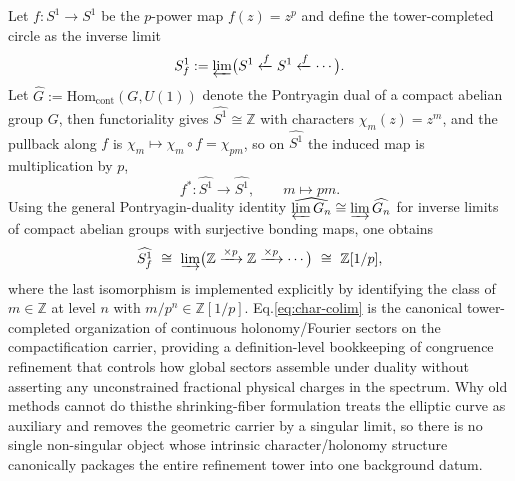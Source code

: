 \documentclass[11pt]{article}
\theoremstyle{remark}
\newcommand{\Z}{\mathbb{Z}}
\begin{document}
Let \(f:S^{1}\to S^{1}\) be the \(p\)-power map \(f(z)=z^{p}\) and define the tower-completed circle as the inverse limit
\begin{equation}\label{eq:Sf1-inv}
S_f^{1}:=\varprojlim\bigl(S^{1}\xleftarrow{f}S^{1}\xleftarrow{f}\cdots\bigr).
\end{equation}
Let \(\widehat{G}:=\mathrm{Hom}_{\mathrm{cont}}(G,U(1))\) denote the Pontryagin dual of a compact abelian group \(G\), then functoriality gives \(\widehat{S^{1}}\cong \Z\) with characters \(\chi_{m}(z)=z^{m}\), and the pullback along \(f\) is \(\chi_{m}\mapsto \chi_{m}\circ f=\chi_{pm}\), so on \(\widehat{S^{1}}\) the induced map is multiplication by \(p\),
\begin{equation}\label{eq:char-pullback}
f^{*}:\widehat{S^{1}}\to \widehat{S^{1}},\qquad m\mapsto pm.
\end{equation}
Using the general Pontryagin-duality identity \(\widehat{\varprojlim G_n}\cong \varinjlim \widehat{G_n}\) for inverse limits of compact abelian groups with surjective bonding maps, one obtains
\begin{equation}\label{eq:char-colim}
\widehat{S_f^{1}}\ \cong\ \varinjlim\bigl(\Z\xrightarrow{\times p}\Z\xrightarrow{\times p}\cdots\bigr)\ \cong\ \Z[1/p],
\end{equation}
where the last isomorphism is implemented explicitly by identifying the class of \(m\in \Z\) at level \(n\) with \(m/p^{n}\in \Z[1/p]\). Eq.\eqref{eq:char-colim} is the canonical tower-completed organization of continuous holonomy/Fourier sectors on the compactification carrier, providing a definition-level bookkeeping of congruence refinement that controls how global sectors assemble under duality without asserting any unconstrained fractional physical charges in the spectrum. Why old methods cannot do this\:the shrinking-fiber formulation treats the elliptic curve as auxiliary and removes the geometric carrier by a singular limit, so there is no single non-singular object whose intrinsic character/holonomy structure canonically packages the entire refinement tower into one background datum.
\end{document}

